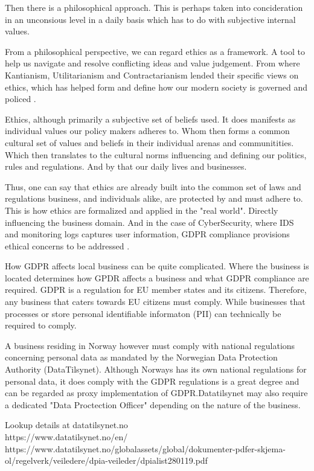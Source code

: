 Then there is a philosophical approach. This is perhaps taken into concideration in an unconsious level in a daily basis which has to do with subjective internal values.

From a philosophical perspective, we can regard ethics as a framework. A tool to help us navigate and resolve conflicting ideas and value judgement. From where Kantianism, Utilitarianism and Contractarianism lended their specific views on ethics, which has helped form and define how our modern society is governed and policed \cite{Courtland2017}.

Ethics, although primarily a subjective set of beliefs used. It does manifests as individual values our policy makers adheres to. Whom then forms a common cultural set of values and beliefs in their individual arenas and communitities. Which then translates to the cultural norms influencing and defining our politics, rules and regulations. And by that our daily lives and businesses.

Thus, one can say that ethics are already built into the common set of laws and regulations business, and individuals alike, are protected by and must adhere to. This is how ethics are formalized and applied in the "real world". Directly influencing the business domain. And in the case of CyberSecurity, where IDS and monitoring logs captures user information, GDPR compliance provisions ethical concerns to be addressed \cite{Haberkorn2019}.

How GDPR affects local business can be quite complicated. Where the business is located determines how GPDR affects a business and what GDPR compliance are required. GDPR is a regulation for EU member states and its citizens. Therefore, any business that caters towards EU citizens must comply. While businesses that processes or store personal identifiable informaton\cite{EuropeanCommission-PII} (PII) can technically be required to comply\cite{Wolford-GDPR_outside_EU}.

A business residing in Norway however must comply with national regulations concerning personal data as mandated by the Norwegian Data Protection Authority (DataTilsynet). Although Norways has its own national regulations for personal data, it does comply with the GDPR regulations is a great degree and can be regarded as proxy implementation of GDPR.Datatilsynet may also require a dedicated "Data Proctection Officer" depending on the nature of the business\cite{Datatilsynet2019_personvernombud}.

\begin{notes}
    Lookup details at datatilsynet.no\\

    https://www.datatilsynet.no/en/\\

    https://www.datatilsynet.no/globalassets/global/dokumenter-pdfer-skjema-ol/regelverk/veiledere/dpia-veileder/dpialist280119.pdf\\

\end{notes}

